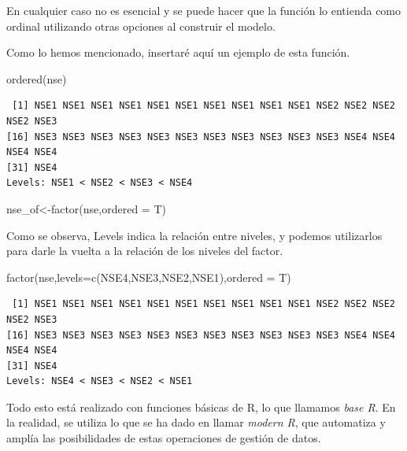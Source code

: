 \documentclass[
  letterpaper,
  DIV=11,
  numbers=noendperiod]{scrreprt}
\newenvironment{Shaded}{\begin{snugshade}}{\end{snugshade}}
\newcommand{\AttributeTok}[1]{\textcolor[rgb]{0.40,0.45,0.13}{#1}}
\newcommand{\FunctionTok}[1]{\textcolor[rgb]{0.28,0.35,0.67}{#1}}
\newcommand{\NormalTok}[1]{\textcolor[rgb]{0.00,0.23,0.31}{#1}}
\newcommand{\OtherTok}[1]{\textcolor[rgb]{0.00,0.23,0.31}{#1}}
\newcommand{\StringTok}[1]{\textcolor[rgb]{0.13,0.47,0.30}{#1}}
\begin{document}
En cualquier caso no es esencial y se puede hacer que la función lo
entienda como ordinal utilizando otras opciones al construir el modelo.

Como lo hemos mencionado, insertaré aquí un ejemplo de esta función.

\begin{Shaded}
\begin{Highlighting}[]
\FunctionTok{ordered}\NormalTok{(nse)}
\end{Highlighting}
\end{Shaded}

\begin{verbatim}
 [1] NSE1 NSE1 NSE1 NSE1 NSE1 NSE1 NSE1 NSE1 NSE1 NSE1 NSE2 NSE2 NSE2 NSE2 NSE3
[16] NSE3 NSE3 NSE3 NSE3 NSE3 NSE3 NSE3 NSE3 NSE3 NSE3 NSE3 NSE4 NSE4 NSE4 NSE4
[31] NSE4
Levels: NSE1 < NSE2 < NSE3 < NSE4
\end{verbatim}

\begin{Shaded}
\begin{Highlighting}[]
\NormalTok{nse\_of}\OtherTok{\textless{}{-}}\FunctionTok{factor}\NormalTok{(nse,}\AttributeTok{ordered =}\NormalTok{ T)}
\end{Highlighting}
\end{Shaded}

Como se observa, Levels indica la relación entre niveles, y podemos
utilizarlos para darle la vuelta a la relación de los niveles del
factor.

\begin{Shaded}
\begin{Highlighting}[]
\FunctionTok{factor}\NormalTok{(nse,}\AttributeTok{levels=}\FunctionTok{c}\NormalTok{(}\StringTok{\textquotesingle{}NSE4\textquotesingle{}}\NormalTok{,}\StringTok{\textquotesingle{}NSE3\textquotesingle{}}\NormalTok{,}\StringTok{\textquotesingle{}NSE2\textquotesingle{}}\NormalTok{,}\StringTok{\textquotesingle{}NSE1\textquotesingle{}}\NormalTok{),}\AttributeTok{ordered =}\NormalTok{ T)}
\end{Highlighting}
\end{Shaded}

\begin{verbatim}
 [1] NSE1 NSE1 NSE1 NSE1 NSE1 NSE1 NSE1 NSE1 NSE1 NSE1 NSE2 NSE2 NSE2 NSE2 NSE3
[16] NSE3 NSE3 NSE3 NSE3 NSE3 NSE3 NSE3 NSE3 NSE3 NSE3 NSE3 NSE4 NSE4 NSE4 NSE4
[31] NSE4
Levels: NSE4 < NSE3 < NSE2 < NSE1
\end{verbatim}

Todo esto está realizado con funciones básicas de R, lo que llamamos
\emph{base R}. En la realidad, se utiliza lo que se ha dado en llamar
\emph{modern R}, que automatiza y amplía las posibilidades de estas
operaciones de gestión de datos.
\end{document}
